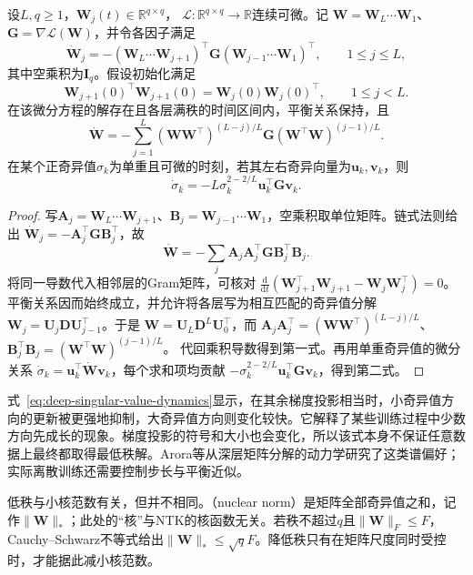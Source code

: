 \begin{theorem}[平衡深层线性网络的梯度流]
\label{thm:balanced-deep-linear-flow}
设$L,q\geq1$，$\bm W_j(t)\in\mathbb R^{q\times q}$，
$\mathcal L:\mathbb R^{q\times q}\to\mathbb R$连续可微。记
$\bm W=\bm W_L\cdots\bm W_1$、$\bm G=\nabla\mathcal L(\bm W)$，并令各因子满足
\[
 \dot{\bm W}_j
 =-(\bm W_L\cdots\bm W_{j+1})^\top
   \bm G
   (\bm W_{j-1}\cdots\bm W_1)^\top,\qquad 1\leq j\leq L,
\]
其中空乘积为$\bm I_q$。假设初始化满足
\[
 \bm W_{j+1}(0)^\top\bm W_{j+1}(0)
 =\bm W_j(0)\bm W_j(0)^\top,\qquad 1\leq j<L.
\]
在该微分方程的解存在且各层满秩的时间区间内，平衡关系保持，且
\begin{equation}
 \dot{\bm W}
 =-\sum_{j=1}^{L}
   (\bm W\bm W^\top)^{(L-j)/L}\bm G
   (\bm W^\top\bm W)^{(j-1)/L}.
 \label{eq:balanced-matrix-gradient-flow}
\end{equation}
在某个正奇异值$\sigma_k$为单重且可微的时刻，若其左右奇异向量为$\bm u_k,\bm v_k$，则
\begin{equation}
 \dot\sigma_k=-L\sigma_k^{2-2/L}\bm u_k^\top\bm G\bm v_k.
 \label{eq:deep-singular-value-dynamics}
\end{equation}
\end{theorem}
\begin{proof}
写$\bm A_j=\bm W_L\cdots\bm W_{j+1}$、$\bm B_j=\bm W_{j-1}\cdots\bm W_1$，空乘积取单位矩阵。链式法则给出
$\dot{\bm W}_j=-\bm A_j^\top\bm G\bm B_j^\top$，故
\[
 \dot{\bm W}=-\sum_j\bm A_j\bm A_j^\top\bm G\bm B_j^\top\bm B_j.
\]
将同一导数代入相邻层的Gram矩阵，可核对
$\frac{\mathrm d}{\mathrm dt}(\bm W_{j+1}^\top\bm W_{j+1}-\bm W_j\bm W_j^\top)=0$。
平衡关系因而始终成立，并允许将各层写为相互匹配的奇异值分解
$\bm W_j=\bm U_j\bm D\bm U_{j-1}^\top$。于是
$\bm W=\bm U_L\bm D^L\bm U_0^\top$，而
$\bm A_j\bm A_j^\top=(\bm W\bm W^\top)^{(L-j)/L}$、
$\bm B_j^\top\bm B_j=(\bm W^\top\bm W)^{(j-1)/L}$。
代回乘积导数得到第一式。再用单重奇异值的微分关系
$\dot\sigma_k=\bm u_k^\top\dot{\bm W}\bm v_k$，每个求和项均贡献
$-\sigma_k^{2-2/L}\bm u_k^\top\bm G\bm v_k$，得到第二式。
\end{proof}

式~\eqref{eq:deep-singular-value-dynamics}显示，在其余梯度投影相当时，小奇异值方向的更新被更强地抑制，大奇异值方向则变化较快。它解释了某些训练过程中少数方向先成长的现象。梯度投影的符号和大小也会变化，所以该式本身不保证任意数据上最终都取得最低秩解。Arora等从深层矩阵分解的动力学研究了这类谱偏好；实际离散训练还需要控制步长与平衡近似。

低秩与小核范数有关，但并不相同。（nuclear norm）是矩阵全部奇异值之和，记作$\|\bm W\|_*$；此处的“核”与NTK的核函数无关。若秩不超过$q$且$\|\bm W\|_F\leq F$，Cauchy--Schwarz不等式给出$\|\bm W\|_*\leq\sqrt qF$。降低秩只有在矩阵尺度同时受控时，才能据此减小核范数。

